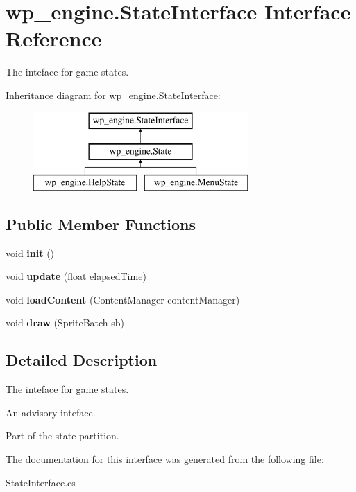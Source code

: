 \hypertarget{interfacewp__engine_1_1_state_interface}{\section{wp\-\_\-engine.\-State\-Interface Interface Reference}
\label{interfacewp__engine_1_1_state_interface}
}


The inteface for game states.  


Inheritance diagram for wp\-\_\-engine.\-State\-Interface\-:\begin{figure}[H]
\begin{center}
\leavevmode
\includegraphics[height=3.000000cm]{interfacewp__engine_1_1_state_interface}
\end{center}
\end{figure}
\subsection*{Public Member Functions}
\begin{DoxyCompactItemize}
\item 
\hypertarget{interfacewp__engine_1_1_state_interface_a62e3b69584f695d55798b64ee98e738d}{void {\bfseries init} ()}\label{interfacewp__engine_1_1_state_interface_a62e3b69584f695d55798b64ee98e738d}

\item 
\hypertarget{interfacewp__engine_1_1_state_interface_ae1e1a65e47766241d880becba6c1a78b}{void {\bfseries update} (float elapsed\-Time)}\label{interfacewp__engine_1_1_state_interface_ae1e1a65e47766241d880becba6c1a78b}

\item 
\hypertarget{interfacewp__engine_1_1_state_interface_a1d96cd68833df5cd1520000801f123a1}{void {\bfseries load\-Content} (Content\-Manager content\-Manager)}\label{interfacewp__engine_1_1_state_interface_a1d96cd68833df5cd1520000801f123a1}

\item 
\hypertarget{interfacewp__engine_1_1_state_interface_a5157886c9fdcef20e5362c5a85503816}{void {\bfseries draw} (Sprite\-Batch sb)}\label{interfacewp__engine_1_1_state_interface_a5157886c9fdcef20e5362c5a85503816}

\end{DoxyCompactItemize}


\subsection{Detailed Description}
The inteface for game states. 

An advisory inteface.

Part of the state partition. 

The documentation for this interface was generated from the following file\-:\begin{DoxyCompactItemize}
\item 
State\-Interface.\-cs\end{DoxyCompactItemize}
